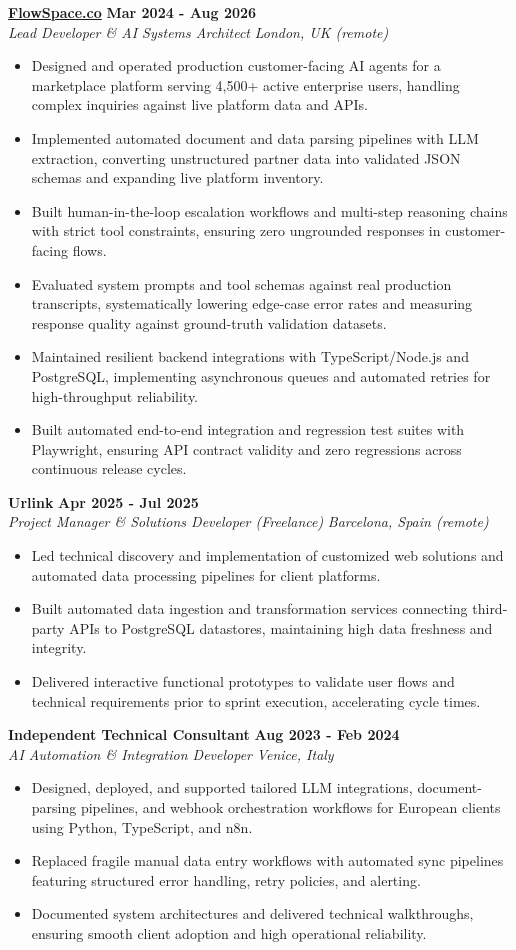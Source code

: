 \documentclass[10pt,a4paper]{article}
\newcommand{\role}[4]{%
  \textbf{#1} \hfill \textbf{#2}\\[1pt]%
  \textit{#3} \hfill \textit{#4}\\[2pt]%
}
\begin{document}
\role{\href{https://flowspace.co}{FlowSpace.co}}{Mar 2024 - Aug 2026}{Lead Developer \& AI Systems Architect}{London, UK (remote)}
\begin{itemize}
  \item Designed and operated production customer-facing AI agents for a marketplace platform serving 4,500+ active enterprise users, handling complex inquiries against live platform data and APIs.
  \item Implemented automated document and data parsing pipelines with LLM extraction, converting unstructured partner data into validated JSON schemas and expanding live platform inventory.
  \item Built human-in-the-loop escalation workflows and multi-step reasoning chains with strict tool constraints, ensuring zero ungrounded responses in customer-facing flows.
  \item Evaluated system prompts and tool schemas against real production transcripts, systematically lowering edge-case error rates and measuring response quality against ground-truth validation datasets.
  \item Maintained resilient backend integrations with TypeScript/Node.js and PostgreSQL, implementing asynchronous queues and automated retries for high-throughput reliability.
  \item Built automated end-to-end integration and regression test suites with Playwright, ensuring API contract validity and zero regressions across continuous release cycles.
\end{itemize}

\role{Urlink}{Apr 2025 - Jul 2025}{Project Manager \& Solutions Developer (Freelance)}{Barcelona, Spain (remote)}
\begin{itemize}
  \item Led technical discovery and implementation of customized web solutions and automated data processing pipelines for client platforms.
  \item Built automated data ingestion and transformation services connecting third-party APIs to PostgreSQL datastores, maintaining high data freshness and integrity.
  \item Delivered interactive functional prototypes to validate user flows and technical requirements prior to sprint execution, accelerating cycle times.
\end{itemize}

\role{Independent Technical Consultant}{Aug 2023 - Feb 2024}{AI Automation \& Integration Developer}{Venice, Italy}
\begin{itemize}
  \item Designed, deployed, and supported tailored LLM integrations, document-parsing pipelines, and webhook orchestration workflows for European clients using Python, TypeScript, and n8n.
  \item Replaced fragile manual data entry workflows with automated sync pipelines featuring structured error handling, retry policies, and alerting.
  \item Documented system architectures and delivered technical walkthroughs, ensuring smooth client adoption and high operational reliability.
\end{itemize}
\end{document}
